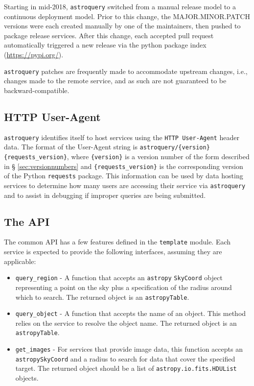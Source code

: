 \documentclass[twocolumn]{aastex61}
\newcommand{\package}[1]{\texttt{#1}\xspace}
\newcommand{\astroquery}{\package{astroquery}}
\newcommand{\astropypkg}{\package{astropy}}
\begin{document}
Starting in mid-2018, \astroquery switched from a manual release model
to a continuous deployment model.  Prior to this change, the MAJOR.MINOR.PATCH
versions were each created manually by one of the maintainers, then pushed
to package release services.  After this change, each accepted pull request
automatically triggered a new release via the python package index
(\url{https://pypi.org/}). 

\astroquery patches are frequently made to accommodate upstream changes, i.e.,
changes made to the remote service, and as such are not guaranteed to be
backward-compatible.

\subsection{HTTP User-Agent}
\label{sec:useragent}
\astroquery identifies itself to host services using the \texttt{HTTP
User-Agent} header data.  The format of the User-Agent string is
\texttt{astroquery/\{version\} \{requests\_version\}}, where
\texttt{\{version\}} is a version number of the form described in \S
\ref{sec:versionnumbers} and \texttt{\{requests\_version\}} is the
corresponding version of the Python
\package{requests} package.  This information can be used by data hosting services
to determine how many users are accessing their service via \astroquery
and to assist in debugging if improper queries are being submitted.


\subsection{The API}
The common API has a few features defined in the \texttt{template} module.
Each service is expected to provide the following interfaces, assuming they are
applicable:

\begin{itemize}
    \item \texttt{query\_region} - A function that accepts an \astropypkg
        \texttt{SkyCoord} object representing a point on the sky plus a
        specification of the radius around which to search.
        The returned object is an \astropypkg \texttt{Table}.
    \item \texttt{query\_object} - A function that accepts the name of an
        object.  This method relies on the service to resolve the object name.
        The returned object is an \astropypkg \texttt{Table}.
    \item \texttt{get\_images} - For services that provide image data, this
        function accepts an \astropypkg \texttt{SkyCoord} and a radius to search for data
        that cover the specified target. The returned object should be a list
        of \texttt{astropy.io.fits.HDUList} objects.
\end{itemize}
\end{document}

